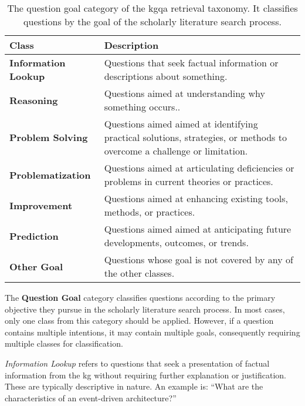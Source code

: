 \begin{table}[t]
    \centering
    \begin{tabular}{@{}lp{8cm}@{}}
        \toprule
        \textbf{Class} & \textbf{Description} \\
        \midrule
            \textbf{Information Lookup}
            & Questions that seek factual information or descriptions about something. \\
        \cmidrule(l){1-2}
            \textbf{Reasoning}
            & Questions aimed at understanding why something occurs.. \\
        \cmidrule(l){1-2}
            \textbf{Problem Solving}
            & Questions aimed aimed at identifying practical solutions, strategies, or methods to overcome a challenge or limitation. \\
        \cmidrule(l){1-2}
            \textbf{Problematization}
            & Questions aimed at articulating deficiencies or problems in current theories or practices. \\
        \cmidrule(l){1-2}
            \textbf{Improvement}
            & Questions aimed at enhancing existing tools, methods, or practices. \\
        \cmidrule(l){1-2}
            \textbf{Prediction}
            & Questions aimed aimed at anticipating future developments, outcomes, or trends. \\
        \cmidrule(l){1-2}
            \textbf{Other Goal}
            & Questions whose goal is not covered by any of the other classes. \\
        \bottomrule
    \end{tabular}
    \caption[Question Goal Category of the Taxonomy]{The question goal category of the \gls{kgqa} retrieval taxonomy. It classifies questions by the goal of the scholarly literature search process.}
    \label{tab:question_goal}
\end{table}

The \textbf{Question Goal} category classifies questions according to the primary objective they pursue in the scholarly literature search process. In most cases, only one class from this category should be applied. However, if a question contains multiple intentions, it may contain multiple goals, consequently requiring multiple classes for classification.

\emph{Information Lookup} refers to questions that seek a presentation of factual information from the \gls{kg} without requiring further explanation or justification. These are typically descriptive in nature. An example is: \enquote{What are the characteristics of an event-driven architecture?}

